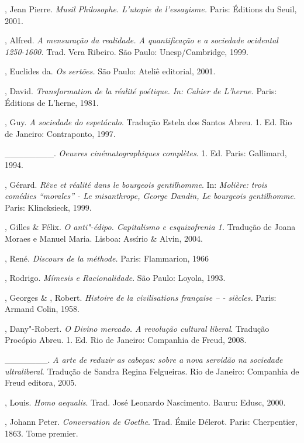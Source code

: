 {\begin{Parskip}
, Jean Pierre. \emph{Musil Philosophe. L'utopie de
l'essayisme.} Paris: Éditions du Seuil, 2001.

, Alfred. \emph{A mensuração da realidade. A quantificação e a
sociedade ocidental 1250-1600.} Trad. Vera Ribeiro. São Paulo:
Unesp/Cambridge, 1999.

, Euclides da. \emph{Os sertões.} São Paulo: Ateliê editorial,
2001.

, David. \emph{Transformation de la réalité poétique. In:}
\emph{Cahier de L'herne.} Paris: Éditions de L'herne, 1981.

, Guy. \emph{A sociedade do espetáculo}. Tradução Estela
dos Santos Abreu. 1. Ed. Rio de Janeiro: Contraponto, 1997.

\_\_\_\_\_\_\_\_. \emph{Oeuvres cinématographiques complètes}.
1. Ed. Paris: Gallimard, 1994.

, Gérard. \emph{Rêve et réalité dans le bourgeois gentilhomme}.
In: \emph{Molière: trois comédies ``morales'' - Le misanthrope, George
Dandin, Le bourgeois gentilhomme.} Paris: Klincksieck, 1999.

, Gilles \&  Félix. \emph{O anti"-édipo. Capitalismo e
esquizofrenia 1.} Tradução de Joana Moraes e Manuel Maria. Lisboa:
Assírio \& Alvin, 2004.

, René. \emph{Discours de la méthode.} Paris: Flammarion,
1966

, Rodrigo. \emph{Mímesis e Racionalidade}. São Paulo: Loyola,
1993.

, Georges \& , Robert. \emph{Histoire de la civilisations
française -- - siècles.} Paris: Armand Colin, 1958.

, Dany"-Robert. \emph{O Divino mercado. A revolução cultural
liberal}. Tradução Procópio Abreu. 1. Ed. Rio de Janeiro:
Companhia de Freud, 2008.

\_\_\_\_\_\_\_. \emph{A arte de reduzir as cabeças: sobre a nova
servidão na sociedade ultraliberal}. Tradução de Sandra Regina
Felgueiras. Rio de Janeiro: Companhia de Freud editora, 2005.

, Louis. \emph{Homo} \emph{aequalis}. Trad. José Leonardo
Nascimento. Bauru: Edusc, 2000.

, Johann Peter. \emph{Conversation de Goethe}. Trad. Émile
Délerot. Paris: Cherpentier, 1863. Tome premier.


\end{Parskip}}
